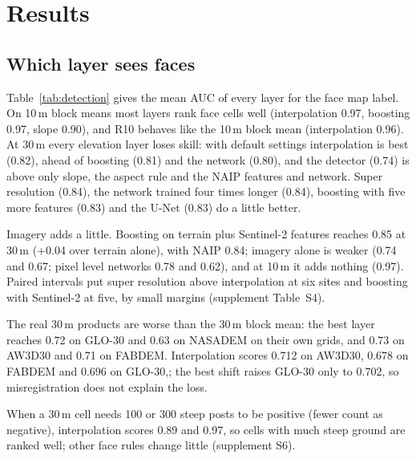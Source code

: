 \documentclass[conference]{IEEEtran}
\begin{document}
\section{Results}
\subsection{Which layer sees faces}
Table~\ref{tab:detection} gives the mean AUC of every layer for the face map label. On 10\,m block means most layers rank face cells well (interpolation 0.97, boosting 0.97, slope 0.90), and R10 behaves like the 10\,m block mean (interpolation 0.96). At 30\,m every elevation layer loses skill: with default settings interpolation is best (0.82), ahead of boosting (0.81) and the network (0.80), and the detector (0.74) is above only slope, the aspect rule and the NAIP features and network. Super resolution (0.84), the network trained four times longer (0.84), boosting with five more features (0.83) and the U-Net (0.83) do a little better.

Imagery adds a little. Boosting on terrain plus Sentinel-2 features reaches 0.85 at 30\,m (+0.04 over terrain alone), with NAIP 0.84; imagery alone is weaker (0.74 and 0.67; pixel level networks 0.78 and 0.62), and at 10\,m it adds nothing (0.97). Paired intervals put super resolution above interpolation at six sites and boosting with Sentinel-2 at five, by small margins (supplement Table~S4).

The real 30\,m products are worse than the 30\,m block mean: the best layer reaches 0.72 on GLO-30 and 0.63 on NASADEM on their own grids, and 0.73 on AW3D30 and 0.71 on FABDEM. Interpolation scores 0.712 on AW3D30, 0.678 on FABDEM and 0.696 on GLO-30,; the best shift raises GLO-30 only to 0.702, so misregistration does not explain the loss.

When a 30\,m cell needs 100 or 300 steep posts to be positive (fewer count as negative), interpolation scores 0.89 and 0.97, so cells with much steep ground are ranked well; other face rules change little (supplement S6).
\end{document}
